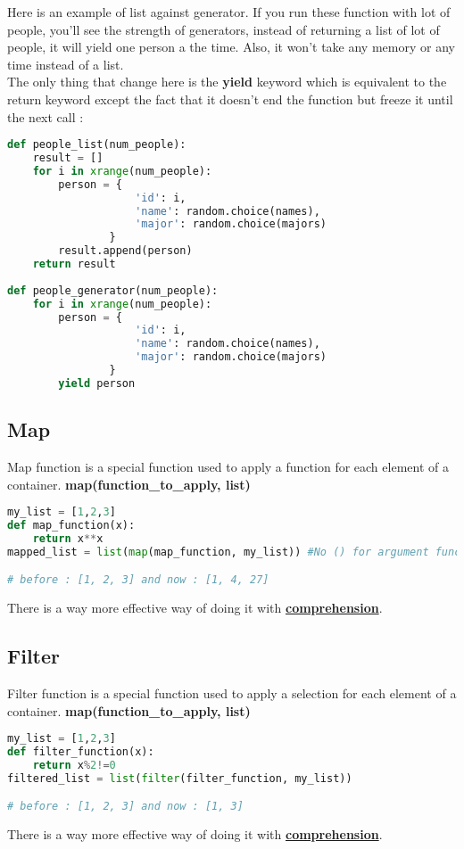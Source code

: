 \documentclass[a4paper, 12pt, titlepage]{scrartcl} %
\begin{document}
Here is an example of list against generator. If you run these function with lot of people, you'll see the strength of generators, instead of returning a list of lot of people, it will yield one person a the time. Also, it won't take any memory or any time instead of a list. \\
The only thing that change here is the \textbf{yield} keyword which is equivalent to the return keyword except the fact that it doesn't end the function but freeze it until the next call :
\begin{lstlisting}[language=Python]
def people_list(num_people):
    result = []
    for i in xrange(num_people):
        person = {
                    'id': i,
                    'name': random.choice(names),
                    'major': random.choice(majors)
                }
        result.append(person)
    return result
    
def people_generator(num_people):
    for i in xrange(num_people):
        person = {
                    'id': i,
                    'name': random.choice(names),
                    'major': random.choice(majors)
                }
        yield person
\end{lstlisting} \vspace{5mm}

\subsection{Map}
Map function is a special function used to apply a function for each element of a container. \textbf{map(function\_to\_apply, list)}
\begin{lstlisting}[language=Python]
my_list = [1,2,3]
def map_function(x):
	return x**x
mapped_list = list(map(map_function, my_list)) #No () for argument function

# before : [1, 2, 3] and now : [1, 4, 27]
\end{lstlisting} \vspace{5mm}
There is a way more effective way of doing it with \hyperref[Comprehension]{\textbf{comprehension}}.

\subsection{Filter}
Filter function is a special function used to apply a selection for each element of a container. \textbf{map(function\_to\_apply, list)}
\begin{lstlisting}[language=Python]
my_list = [1,2,3]
def filter_function(x):
	return x%2!=0
filtered_list = list(filter(filter_function, my_list))

# before : [1, 2, 3] and now : [1, 3]
\end{lstlisting} \vspace{5mm}
There is a way more effective way of doing it with \hyperref[Comprehension]{\textbf{comprehension}}.
\end{document}

